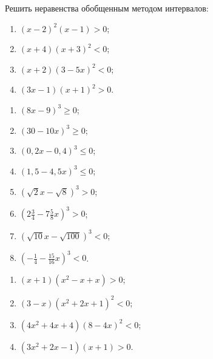 \documentclass[algebra,twocolumn]{pum}
\begin{document}
\begin{exercises}
  Решить неравенства обобщенным методом интервалов:
  \begin{question}
    \vspace{-13pt}
    \begin{enumerate}
      \item $(x-2)^2(x-1)>0$;
      \item $(x+4)(x+3)^2<0$;
      \item $(x+2)(3-5x)^2<0$;
      \item $(3x-1)(x+1)^2>0$.
    \end{enumerate}
  \end{question}
  \begin{question}
    \vspace{-13pt}
    \begin{enumerate}
      \item $(8x-9)^3\ge0$;
      \item $(30-10x)^3\ge0$;
      \item $(0,2x-0,4)^3\le0$;
      \item $(1,5-4,5x)^3\le0$;
      \item $(\sqrt{2}x-\sqrt{8})^3>0$;
      \item $(2\frac{3}{4}-7\frac{5}{8}x)^3>0$;
      \item $(\sqrt{10}x-\sqrt{100})^3<0$;
      \item $(-\frac{1}{4}-\frac{15}{16}x)^3<0$.
    \end{enumerate}
  \end{question}
  \begin{question}
    \vspace{-13pt}
    \begin{enumerate}
      \item $(x+1)(x^2-x+x)>0$;
      \item $(3-x)(x^2+2x+1)^2<0$;
      \item $(4x^2+4x+4)(8-4x)^2<0$;
      \item $(3x^2+2x-1)(x+1)>0$.
    \end{enumerate}
  \end{question}
\end{exercises}
\end{document}
